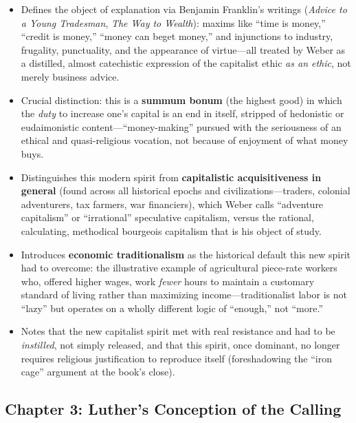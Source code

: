 \documentclass[12pt]{article}
\begin{document}
\begin{itemize}[leftmargin=*, itemsep=4pt]
    \item Defines the object of explanation via Benjamin Franklin's writings (\textit{Advice to a Young Tradesman}, \textit{The Way to Wealth}): maxims like ``time is money,'' ``credit is money,'' ``money can beget money,'' and injunctions to industry, frugality, punctuality, and the appearance of virtue---all treated by Weber as a distilled, almost catechistic expression of the capitalist ethic \emph{as an ethic}, not merely business advice.
    \item Crucial distinction: this is a \textbf{summum bonum} (the highest good) in which the \emph{duty} to increase one's capital is an end in itself, stripped of hedonistic or eudaimonistic content---``money-making'' pursued with the seriousness of an ethical and quasi-religious vocation, not because of enjoyment of what money buys.
    \item Distinguishes this modern spirit from \textbf{capitalistic acquisitiveness in general} (found across all historical epochs and civilizations---traders, colonial adventurers, tax farmers, war financiers), which Weber calls ``adventure capitalism'' or ``irrational'' speculative capitalism, versus the rational, calculating, methodical bourgeois capitalism that is his object of study.
    \item Introduces \textbf{economic traditionalism} as the historical default this new spirit had to overcome: the illustrative example of agricultural piece-rate workers who, offered higher wages, work \emph{fewer} hours to maintain a customary standard of living rather than maximizing income---traditionalist labor is not ``lazy'' but operates on a wholly different logic of ``enough,'' not ``more.''
    \item Notes that the new capitalist spirit met with real resistance and had to be \emph{instilled}, not simply released, and that this spirit, once dominant, no longer requires religious justification to reproduce itself (foreshadowing the ``iron cage'' argument at the book's close).
\end{itemize}

\subsection*{Chapter 3: Luther's Conception of the Calling}
\end{document}
